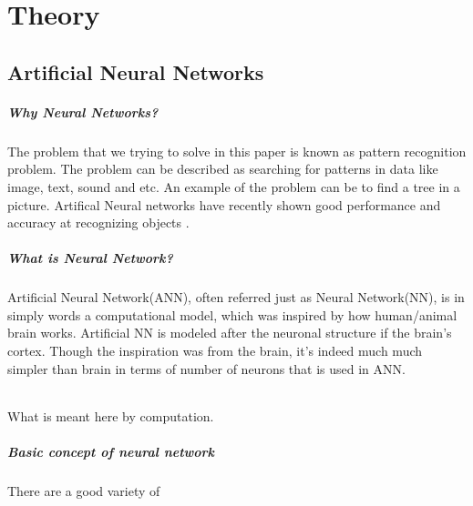 \chapter{Theory}
\section{Artificial Neural Networks}
\paragraph{Why Neural Networks?}
The problem that we trying to solve in this paper is known as
pattern recognition problem. The problem can be described
as searching for patterns in data like image, text, sound and etc. An example
of the problem can be to find a tree in a picture.
Artifical Neural networks have recently shown good performance and accuracy at recognizing
objects \cite{Krizhevsky2012}.

\paragraph{What is Neural Network?}
Artificial Neural Network(ANN), often referred just as Neural Network(NN),
is in simply words a computational model, which was inspired by how human/animal
brain works. Artificial NN is modeled after the neuronal structure if the brain's
cortex\cite{Goodfellow-et-al-2016}. Though the inspiration was from the brain,
it's indeed much much simpler than brain in terms of number of neurons that is used
in ANN.
\subparagraph{} What is meant here by computation.

\paragraph{Basic concept of neural network}
There are a good variety of
